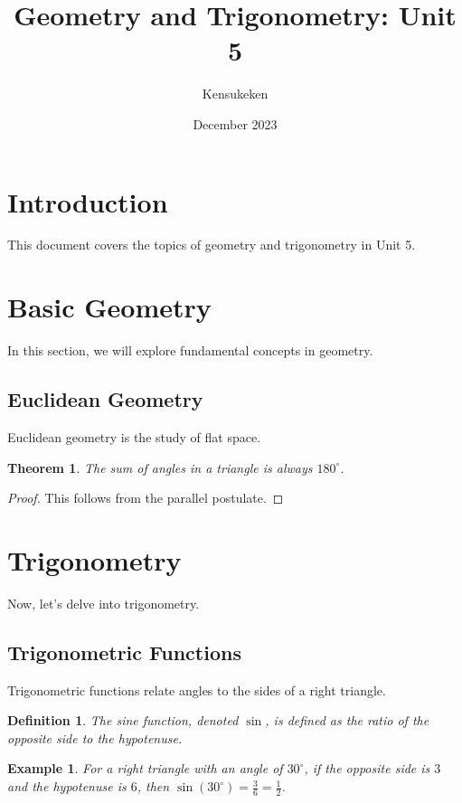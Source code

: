 \documentclass{article}
\newtheorem{theorem}{Theorem}[section]
\newtheorem{definition}{Definition}[section]
\newtheorem{example}{Example}[section]
\begin{document}
\title{Geometry and Trigonometry: Unit 5}
\author{Kensukeken}
\date{December 2023}
\maketitle

\section{Introduction}
This document covers the topics of geometry and trigonometry in Unit 5.

\section{Basic Geometry}
In this section, we will explore fundamental concepts in geometry.

\subsection{Euclidean Geometry}
Euclidean geometry is the study of flat space.

\begin{theorem}
The sum of angles in a triangle is always $180^\circ$.
\end{theorem}

\begin{proof}
This follows from the parallel postulate.
\end{proof}

\section{Trigonometry}
Now, let's delve into trigonometry.

\subsection{Trigonometric Functions}
Trigonometric functions relate angles to the sides of a right triangle.

\begin{definition}
The sine function, denoted $\sin$, is defined as the ratio of the opposite side to the hypotenuse.
\end{definition}

\begin{example}
For a right triangle with an angle of $30^\circ$, if the opposite side is $3$ and the hypotenuse is $6$, then $\sin(30^\circ) = \frac{3}{6} = \frac{1}{2}$.
\end{example}
\end{document}
